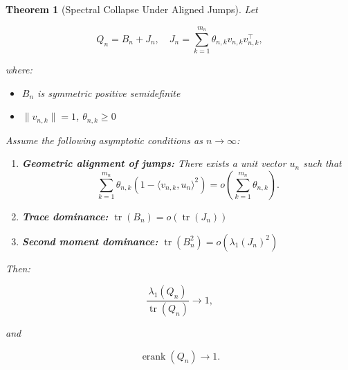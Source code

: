 \documentclass{article}
\newtheorem{theorem}{Theorem}
\begin{document}
\begin{theorem}[Spectral Collapse Under Aligned Jumps]
Let

\[
Q_n = B_n + J_n, \quad J_n = \sum_{k=1}^{m_n} \theta_{n,k} v_{n,k} v_{n,k}^\top,
\]

where:
\begin{itemize}
\item \(B_n\) is symmetric positive semidefinite
\item \(\|v_{n,k}\| = 1\), \(\theta_{n,k} \ge 0\)
\end{itemize}

Assume the following asymptotic conditions as \(n \to \infty\):

\begin{enumerate}
\item \textbf{Geometric alignment of jumps:} There exists a unit vector \(u_n\) such that
\[
\sum_{k=1}^{m_n} \theta_{n,k} \left(1 - \langle v_{n,k}, u_n \rangle^2 \right) = o\left(\sum_{k=1}^{m_n} \theta_{n,k}\right).
\]

\item \textbf{Trace dominance:} \(\operatorname{tr}(B_n) = o(\operatorname{tr}(J_n))\)

\item \textbf{Second moment dominance:} \(\operatorname{tr}(B_n^2) = o(\lambda_1(J_n)^2)\)
\end{enumerate}

Then:

\[
\frac{\lambda_1(Q_n)}{\operatorname{tr}(Q_n)} \to 1,
\]

and

\[
\operatorname{erank}(Q_n) \to 1.
\]

\end{theorem}
\end{document}
